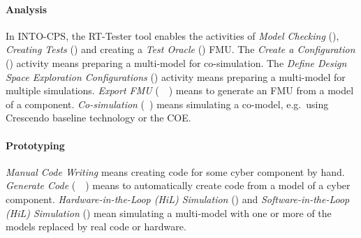 \paragraph{Analysis}

In INTO-CPS, the RT-Tester tool enables the activities of \emph{Model Checking} (\RTTester), \emph{Creating Tests} (\RTTester) and creating a \emph{Test Oracle} (\RTTester) FMU. The \emph{Create a Configuration} (\INTOCPS) activity means preparing a multi-model for co-simulation. The \emph{Define Design Space Exploration Configurations} (\INTOCPS) activity means preparing a multi-model for multiple simulations. \emph{Export FMU} (\Overture~\TwentySim~\OpenModelica)  means to generate an FMU from a model of a component. \emph{Co-simulation} (\Crescendo~\INTOCPS) means simulating a co-model, e.g.\ using Crescendo baseline technology or the COE.

\paragraph{Prototyping}

\emph{Manual Code Writing} means creating code for some cyber component by hand. \emph{Generate Code} (\Overture~\TwentySim~\OpenModelica) means to automatically create code from a model of a cyber component. \emph{Hardware-in-the-Loop (HiL) Simulation} (\INTOCPS) and \emph{Software-in-the-Loop (HiL) Simulation} (\INTOCPS) mean simulating a multi-model with one or more of the models replaced by real code or hardware.



